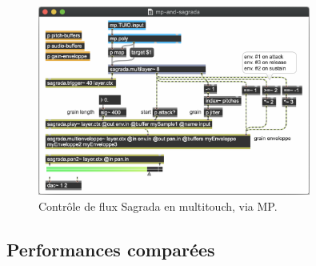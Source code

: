 \begin{figure}[!htbp]
	\captionsetup{format=plain}
	\includegraphics[width=0.8\textwidth]{gfx/04_algorithms/mp-and-sagrada.png}
	\caption[Contrôle de flux Sagrada avec MP]{Contrôle de flux Sagrada en multitouch, via MP.}
	\label{fig:algorithms:MP-and-Sagrada}
\end{figure}



\subsection{Performances comparées}

